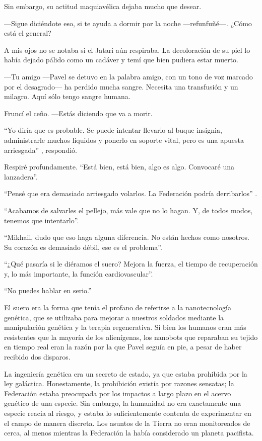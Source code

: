 Sin embargo, su actitud maquiavélica dejaba mucho que desear.

—Sigue diciéndote eso, si te ayuda a dormir por la noche —refunfuñé—. ¿Cómo está el general?

A mis ojos no se notaba si el Jatari aún respiraba. La decoloración de su piel lo había dejado pálido como un cadáver y temí que bien pudiera estar muerto.

—Tu amigo —Pavel se detuvo en la palabra amigo, con un tono de voz marcado por el desagrado— ha perdido mucha sangre. Necesita una transfusión y un milagro. Aquí sólo tengo sangre humana.

Fruncí el ceño. —Estás diciendo que va a morir.

``Yo diría que es probable. Se puede intentar llevarlo al buque insignia, administrarle muchos líquidos y ponerlo en soporte vital, pero es una apuesta arriesgada''
, respondió.

Respiré profundamente. ``Está bien, está bien, algo es algo. Convocaré una lanzadera''.

``Pensé que era demasiado arriesgado volarlos. La Federación podría derribarlos''
.

``Acabamos de salvarles el pellejo, más vale que no lo hagan. Y, de todos modos, tenemos que intentarlo''.

``Mikhail, dudo que eso haga alguna diferencia. No están hechos como nosotros. Su corazón es demasiado débil, ese es el problema''.

``¿Qué pasaría si le diéramos el suero? Mejora la fuerza, el tiempo de recuperación y, lo más importante, la función cardiovascular''.

``No puedes hablar en serio.''


El suero era la forma que tenía el profano de referirse a la nanotecnología genética, que se utilizaba para mejorar a nuestros soldados mediante la manipulación genética y la terapia regenerativa. Si bien los humanos eran más resistentes que la mayoría de los alienígenas, los nanobots que reparaban su tejido en tiempo real eran la razón por la que Pavel seguía en pie, a pesar de haber recibido dos disparos.

La ingeniería genética era un secreto de estado, ya que estaba prohibida por la ley galáctica. Honestamente, la prohibición existía por razones sensatas; la Federación estaba preocupada por los impactos a largo plazo en el acervo genético de una especie. Sin embargo, la humanidad no era exactamente una especie reacia al riesgo, y estaba lo suficientemente contenta de experimentar en el campo de manera discreta. Los asuntos de la Tierra no eran monitoreados de cerca, al menos mientras la Federación la había considerado un planeta pacifista.

